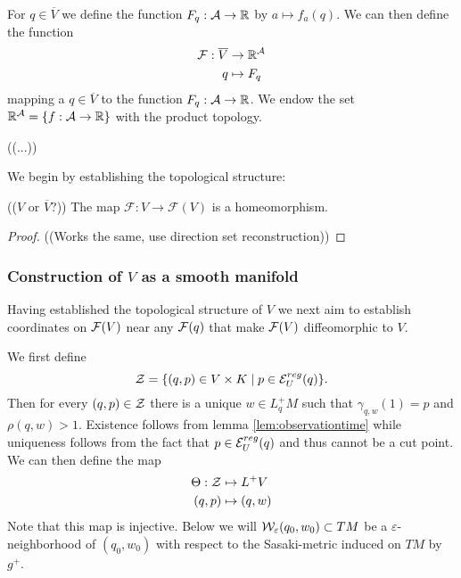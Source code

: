 For $q\in \overline{V}$ we define the function $F_q:\mathcal{A}\to\mathbb{R}$ by $a\mapsto f_a(q)$. We can then define the function 
\begin{align*}
    \mathcal{F}:\overline{V} &\to \mathbb{R}^\mathcal{A}\\
    q&\mapsto F_q
\end{align*} mapping a $q\in \overline{V}$ to the function $F_q:\mathcal{A}\to\mathbb{R}$. We endow the set $\mathbb{R}^\mathcal{A} = \{f:\mathcal{A}\to \mathbb{R}\}$ with the product topology.

((...))

We begin by establishing the topological structure:
\begin{lemma}\label{lem:Fhomeo}
(($V$ or $\overline{V}$?))
The map $\mathcal{F}:V\to\mathcal{F}(V)$ is a homeomorphism.
\end{lemma}
\begin{proof}
((Works the same, use direction set reconstruction))
\end{proof}


\subsubsection{Construction of $V$ as a smooth manifold}
Having established the topological structure of $V$ we next aim to establish coordinates on $\mathcal{F}(V)$ near any $\mathcal{F}(q)$ that make $\mathcal{F}(V)$ diffeomorphic to $V$.

\begin{definition}[Coordinates on $V$]
We first define 
\[
    \mathcal{Z} = \{(q,p)\in V\times K \mid p\in \mathcal{E}_U^{reg}(q)\}.
\] 
Then for every $(q,p)\in \mathcal{Z}$ there is a unique $w\in L^+_qM$ such that $\gamma_{q,w}(1)=p$ and $\rho(q,w)>1$. Existence follows from lemma \ref{lem:observationtime} while uniqueness follows from the fact that $p\in \mathcal{E}_U^{reg}(q)$ and thus cannot be a cut point. 
We can then define the map
\begin{align*}
    \Theta:\mathcal{Z}&\mapsto L^+V\\
    (q,p)&\mapsto (q,w)
\end{align*}
Note that this map is injective.
Below we will $\mathcal{W}_\varepsilon(q_0,w_0)\subset TM$ be a $\varepsilon$-neighborhood of $(q_0,w_0)$ with respect to the Sasaki-metric induced on $TM$ by $g^+$.
\end{definition}


